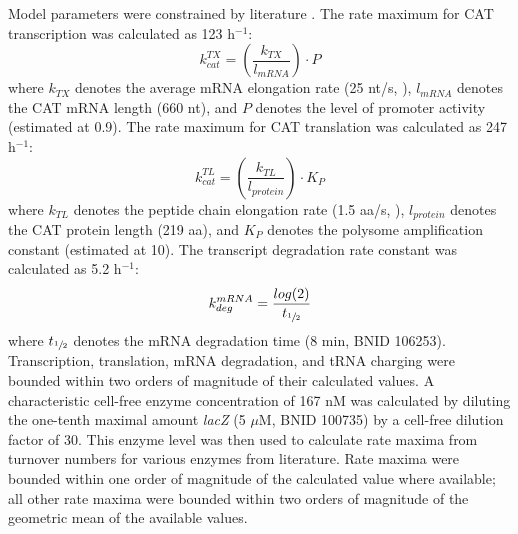 \documentclass[12pt]{article}
\begin{document}
Model parameters were constrained by literature \cite{Milo:2009aa}.
The rate maximum for CAT transcription was calculated as 123 h$^{-1}$:
\begin{equation}\label{eqn:transcription}
	k_{cat}^{TX}=\left(\frac{k_{TX}}{l_{mRNA}}\right)\cdot P
\end{equation}
where $k_{TX}$ denotes the average mRNA elongation rate (25 nt/s, \cite{Garamella:2016aa}), $l_{mRNA}$ denotes the CAT mRNA length (660 nt), and $P$ denotes the level of promoter activity (estimated at 0.9).
The rate maximum for CAT translation was calculated as 247 h$^{-1}$:
\begin{equation}\label{eqn:transcription}
	k_{cat}^{TL}=\left(\frac{k_{TL}}{l_{protein}}\right)\cdot K_P
\end{equation}
where $k_{TL}$ denotes the peptide chain elongation rate (1.5 aa/s, \cite{Garamella:2016aa}), $l_{protein}$ denotes the CAT protein length (219 aa), and $K_P$ denotes the polysome amplification constant (estimated at 10).
The transcript degradation rate constant was calculated as 5.2 h$^{-1}$:
\begin{equation}\label{eqn:transcription}
	k_{deg}^{mRNA}=\frac{log(2)}{t_{\sfrac{1}{2}}}
\end{equation}
where $t_{\sfrac{1}{2}}$ denotes the mRNA degradation time (8 min, BNID 106253).
Transcription, translation, mRNA degradation, and tRNA charging were bounded within two orders of magnitude of their calculated values.
A characteristic cell-free enzyme concentration of 167 nM was calculated by diluting the one-tenth maximal amount \textit{lacZ} (5 $\mu$M, BNID 100735) by a cell-free dilution factor of 30.
This enzyme level was then used to calculate rate maxima from turnover numbers for various enzymes from literature.
Rate maxima were bounded within one order of magnitude of the calculated value where available; all other rate maxima were bounded within two orders of magnitude of the geometric mean of the available values.
\end{document}
